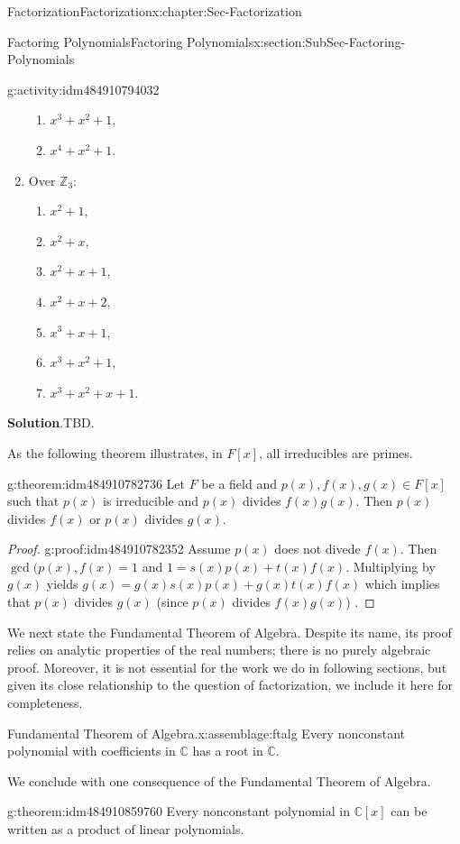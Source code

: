 \documentclass[oneside,10pt,]{book}
\newcommand{\blocktitlefont}{\relax}
\numberwithin{equation}{section}
\def\C{{\mathbb C}}
\def\Z{{\mathbb Z}}
\begin{document}
\begin{chapterptx}{Factorization}{}{Factorization}{}{}{x:chapter:Sec-Factorization}
\begin{sectionptx}{Factoring Polynomials}{}{Factoring Polynomials}{}{}{x:section:SubSec-Factoring-Polynomials}
\begin{activity}{}{g:activity:idm484910794032}
\begin{enumerate}
\begin{enumerate}
\item{}\(x^3 + x^2 + 1\),%
\item{}\(x^4 + x^2 + 1\).%
\end{enumerate}
\item{}Over \(\Z_3\):%
%
\begin{enumerate}
\item{}\(x^2 + 1\),%
\item{}\(x^2 + x\),%
\item{}\(x^2 +x +1\),%
\item{}\(x^2 +x +2\),%
\item{}\(x^3 + x +1\),%
\item{}\(x^3 + x^2 + 1\),%
\item{}\(x^3 + x^2 + x + 1\).%
\end{enumerate}
\end{enumerate}
\par\smallskip%
\noindent\textbf{\blocktitlefont Solution}.\hypertarget{g:solution:idm484910783760}{}\quad{}TBD.%
\end{activity}
As the following theorem illustrates, in \(F[x]\), all irreducibles are primes.%
\begin{theorem}{}{}{g:theorem:idm484910782736}%
Let \(F\) be a field and \(p(x),f(x),g(x)\in F[x]\) such that \(p(x)\) is irreducible and \(p(x)\) divides \(f(x) g(x)\). Then \(p(x)\) divides \(f(x)\) or \(p(x)\) divides \(g(x)\).%
\end{theorem}
\begin{proof}{}{g:proof:idm484910782352}
Assume \(p(x)\) does not divede \(f(x)\). Then \(\gcd(p(x),f(x)=1\) and \(1=s(x)p(x)+t(x)f(x)\). Multiplying by \(g(x)\) yields \(g(x)=g(x)s(x)p(x)+g(x)t(x)f(x)\) which implies that \(p(x)\) divides \(g(x)\) (since \(p(x)\) divides \(f(x)g(x)\)) .%
\end{proof}
We next state the Fundamental Theorem of Algebra. Despite its name, its proof relies on analytic properties of the real numbers; there is no purely algebraic proof. Moreover, it is not essential for the work we do in following sections, but given its close relationship to the question of factorization, we include it here for completeness.%
\begin{assemblage}{Fundamental Theorem of Algebra.}{x:assemblage:ftalg}%
Every nonconstant polynomial with coefficients in \(\C\) has a root in \(\C\).%
\end{assemblage}
We conclude with one consequence of the Fundamental Theorem of Algebra.%
\begin{theorem}{}{}{g:theorem:idm484910859760}%
Every nonconstant polynomial in \(\C[x]\) can be written as a product of linear polynomials.%


\end{theorem}
\end{sectionptx}
\end{chapterptx}
\end{document}
